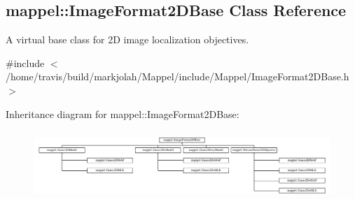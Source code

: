 \hypertarget{classmappel_1_1ImageFormat2DBase}{}\subsection{mappel\+:\+:Image\+Format2\+D\+Base Class Reference}
\label{classmappel_1_1ImageFormat2DBase}


A virtual base class for 2D image localization objectives.  




{\ttfamily \#include $<$/home/travis/build/markjolah/\+Mappel/include/\+Mappel/\+Image\+Format2\+D\+Base.\+h$>$}

Inheritance diagram for mappel\+:\+:Image\+Format2\+D\+Base\+:\begin{figure}[H]
\begin{center}
\leavevmode
\includegraphics[height=2.641510cm]{classmappel_1_1ImageFormat2DBase}
\end{center}
\end{figure}
